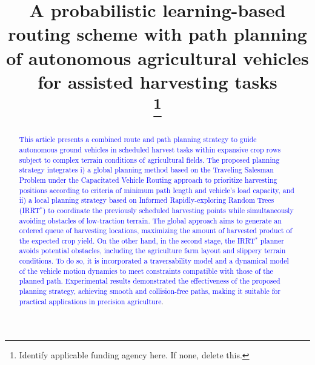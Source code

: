 \documentclass[conference]{IEEEtran}
\begin{document}
\title{A probabilistic learning-based routing scheme with path planning of autonomous agricultural vehicles for assisted harvesting tasks\\
\thanks{Identify applicable funding agency here. If none, delete this.}
}

\author{
\and
{}
\and
{}
}

\maketitle

\begin{abstract}
\textcolor{blue}{This article presents a combined route and path planning strategy to guide autonomous ground vehicles in scheduled harvest tasks within expansive crop rows subject to complex terrain conditions of agricultural fields. The proposed planning strategy integrates i) a global planning method based on the Traveling Salesman Problem under the Capacitated Vehicle Routing approach to prioritize harvesting positions according to criteria of minimum path length and vehicle's load capacity, and ii) a local planning strategy based on Informed Rapidly-exploring Random Trees (IRRT$^*$) to coordinate the previously scheduled harvesting points while simultaneously avoiding obstacles of low-traction terrain. The global approach aims to generate an ordered queue of harvesting locations, maximizing the amount of harvested product of the expected crop yield. On the other hand, in the second stage, the IRRT$^*$ planner avoids potential obstacles, including the agriculture farm layout and slippery terrain conditions. To do so, it is incorporated a traversability model and a dynamical model of the vehicle motion dynamics to meet constraints compatible with those of the planned path. Experimental results demonstrated the effectiveness of the proposed planning strategy, achieving smooth and collision-free paths, making it suitable for practical applications in precision agriculture}.  
\end{abstract}
\end{document}
